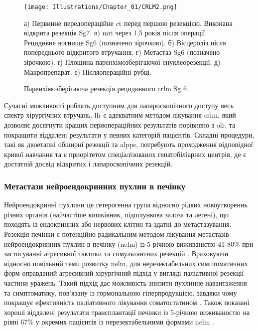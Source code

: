\begin{refsection}
\begin{figure}[!ht]
\caption{Паренхімозберігаюча резекція рецидивного \acrshort{crlm} Sg 6}

\texttt{[image: Illustrations/Chapter\_01/CRLM2.png]}
\label{fig:CRLM2}

\medskip
\small
а) Первинне передопераційне \acrshort{ct} перед першою резекцією. Виконана відкрита резекція Sg7. в) \acrshort{mri} через 1,5 років після операції. Рецидивне вогнище Sg6 (позначено зірочкою). б) Вісцероліз після попереднього відкритого втручання. г) Метастаз Sg6 (позначено зірочкою). ґ) Площина паренхімозберігаючої енуклеорезекції. д) Макропрепарат. е) Післяопераційні рубці.

\end{figure}




Сучасні можливості роблять доступним для лапароскопічного доступу весь спектр хірургічних втручань. \acrshort{llr} є адекватним методом лікування \acrshort{crlm}, який дозволяє досягнути кращих периопераційних результатів порівняно з \acrshort{olr}, та покращити віддалені результати у певних категорій пацієнтів. Складні процедури, такі як  двоетапні обширні резекції та \acrshort{alpps}, потребують проходження відповідної кривої навчання та є приорітетом спеціалізованих гепатобіліарних центрів, де є достатній досвід відкритих і лапароскопічних резекцій.

\subsubsection{Метастази нейроендокринних пухлин в печінку}

Нейроендокринні пухлини це гетерогенна група відносно рідких новоутвореннь різних органів (найчастіше кишківник, підшлункова залоза та легені), що походять із ендокринних або нервових клітин та здатні до метастазування. Резекція печінки є потенційно радикальним методом лікування метастазів нейроендокринних пухлин в печінку (\acrshort{nelm}) із 5-річною виживаністю 41-80\% при застосуванні агресивної тактики та симультантних резекцій \cite{Liu2009}. Враховуючи відносно повільний темп розвитку \acrshort{nelm}, для нерезектабельних симптоматичних форм оправданий агресивний хірургічний підхід у вигляді паліативної резекції частини уражень. Такий підхід дає можливість знизити пухлинне навантаження та симптоматику, пов'язану із гормональною гіперпродукцією, завдяки чому покращує ефективність паліативного лікування соматостатином \cite{Schmidt2014}. Також показані хороші віддалені результати трансплантації печінки із 5-річною виживаностю на рівні 67\% у окремих пацієнтів із нерезектабельними формами \acrshort{nelm} \cite{Moris2017a}.


\end{refsection}

